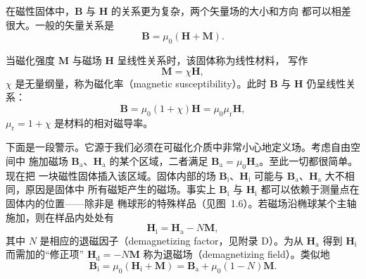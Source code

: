 在磁性固体中，$\mathbf{B}$ 与 $\mathbf{H}$ 的关系更为复杂，两个矢量场的大小和方向
都可以相差很大。一般的矢量关系是
\begin{equation*}
\mathbf{B} = \mu_{0}(\mathbf{H} + \mathbf{M}).\tag{1.17}
\end{equation*}

当磁化强度 $\mathbf{M}$ 与磁场 $\mathbf{H}$ 呈线性关系时，该固体称为线性材料，
写作
\begin{equation*}
\mathbf{M} = \chi\mathbf{H},\tag{1.18}
\end{equation*}
$\chi$ 是无量纲量，称为磁化率（magnetic susceptibility）。此时 $\mathbf{B}$ 与
$\mathbf{H}$ 仍呈线性关系：
\begin{equation*}
\mathbf{B} = \mu_{0}(1+\chi)\mathbf{H} = \mu_{0}\mu_{\mathrm{r}}\mathbf{H},\tag{1.19}
\end{equation*}
$\mu_{\mathrm{r}}=1+\chi$ 是材料的相对磁导率。

下面是一段警示。它源于我们必须在可磁化介质中非常小心地定义场。考虑自由空间中
施加磁场 $\mathbf{B}_{\mathrm{a}}$、$\mathbf{H}_{\mathrm{a}}$ 的某个区域，二者满足
$\mathbf{B}_{\mathrm{a}}=\mu_{0}\mathbf{H}_{\mathrm{a}}$。至此一切都很简单。现在把
一块磁性固体插入该区域。固体内部的场 $\mathbf{B}_{\mathrm{i}}$、$\mathbf{H}_{\mathrm{i}}$
可能与 $\mathbf{B}_{\mathrm{a}}$、$\mathbf{H}_{\mathrm{a}}$ 大不相同，原因是固体中
所有磁矩产生的磁场。事实上 $\mathbf{B}_{\mathrm{i}}$ 与 $\mathbf{H}_{\mathrm{i}}$
都可以依赖于测量点在固体内的位置——除非是
椭球形的特殊样品（见图~1.6）。若磁场沿椭球某个主轴施加，则在样品内处处有
\begin{equation*}
\mathbf{H}_{\mathrm{i}} = \mathbf{H}_{\mathrm{a}} - N\mathbf{M},\tag{1.20}
\end{equation*}
其中 $N$ 是相应的退磁因子（demagnetizing factor，见附录 D）。为从 $\mathbf{H}_{\mathrm{a}}$
得到 $\mathbf{H}_{\mathrm{i}}$ 而需加的“修正项” $\mathbf{H}_{\mathrm{d}}=-N\mathbf{M}$
称为退磁场（demagnetizing field）。类似地
\begin{equation*}
\mathbf{B}_{\mathrm{i}} = \mu_{0}(\mathbf{H}_{\mathrm{i}} + \mathbf{M}) = \mathbf{B}_{\mathrm{a}} + \mu_{0}(1-N)\mathbf{M}.\tag{1.21}
\end{equation*}

